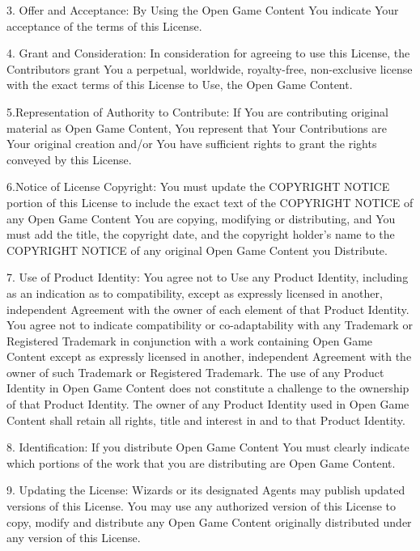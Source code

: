 \documentclass[11pt]{article}
\begin{document}
\bigskip

3. Offer and Acceptance: By Using the Open Game Content You indicate Your acceptance of the terms of this License.

\bigskip

4. Grant and Consideration: In consideration for agreeing to use this License, the Contributors grant You a perpetual, worldwide, royalty-free, non-exclusive license with the exact terms of this License to Use, the Open Game Content.

\bigskip

5.Representation of Authority to Contribute: If You are contributing original material as Open Game Content, You represent that Your Contributions are Your original creation and/or You have sufficient rights to grant the rights conveyed by this License.

\bigskip

6.Notice of License Copyright: You must update the COPYRIGHT NOTICE portion of this License to include the exact text of the COPYRIGHT NOTICE of any Open Game Content You are copying, modifying or distributing, and You must add the title, the copyright date, and the copyright holder's name to the COPYRIGHT NOTICE of any original Open Game Content you Distribute.

\bigskip

7. Use of Product Identity: You agree not to Use any Product Identity, including as an indication as to compatibility, except as expressly licensed in another, independent Agreement with the owner of each element of that Product Identity. You agree not to indicate compatibility or co-adaptability with any Trademark or Registered Trademark in conjunction with a work containing Open Game Content except as expressly licensed in another, independent Agreement with the owner of such Trademark or Registered Trademark. The use of any Product Identity in Open Game Content does not constitute a challenge to the ownership of that Product Identity. The owner of any Product Identity used in Open Game Content shall retain all rights, title and interest in and to that Product Identity.

\bigskip

8. Identification: If you distribute Open Game Content You must clearly indicate which portions of the work that you are distributing are Open Game Content.

\bigskip

9. Updating the License: Wizards or its designated Agents may publish updated versions of this License. You may use any authorized version of this License to copy, modify and distribute any Open Game Content originally distributed under any version of this License.
\end{document}
